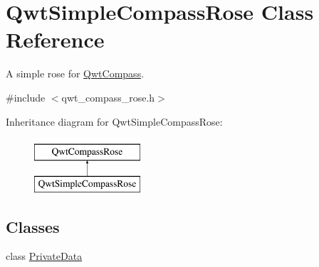 \hypertarget{class_qwt_simple_compass_rose}{\section{Qwt\-Simple\-Compass\-Rose Class Reference}
\label{class_qwt_simple_compass_rose}
}


A simple rose for \hyperlink{class_qwt_compass}{Qwt\-Compass}.  




{\ttfamily \#include $<$qwt\-\_\-compass\-\_\-rose.\-h$>$}

Inheritance diagram for Qwt\-Simple\-Compass\-Rose\-:\begin{figure}[H]
\begin{center}
\leavevmode
\includegraphics[height=2.000000cm]{class_qwt_simple_compass_rose}
\end{center}
\end{figure}
\subsection*{Classes}
\begin{DoxyCompactItemize}
\item 
class \hyperlink{class_qwt_simple_compass_rose_1_1_private_data}{Private\-Data}
\end{DoxyCompactItemize}
